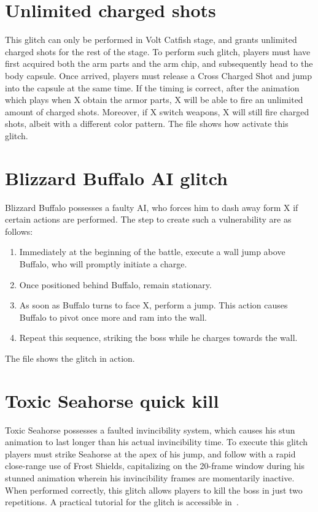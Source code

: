 \section{Unlimited charged shots}
This glitch can only be performed in Volt Catfish stage, and grants unlimited charged shots for the rest of the stage. To perform such glitch, players must have first acquired both the arm parts and the arm chip, and subsequently head to the body capsule. Once arrived, players must release a Cross Charged Shot and jump into the capsule at the same time. If the timing is correct, after the animation which plays when X obtain the armor parts, X will be able to fire an unlimited amount of charged shots. Moreover, if X switch weapons, X will still fire charged shots, albeit with a different color pattern. The file  shows how activate this glitch.

\section{Blizzard Buffalo AI glitch}\label{glitch:Buffalo_AI}
Blizzard Buffalo possesses a faulty AI, who forces him to dash away form X if certain actions are performed. The step to create such a vulnerability are as follows:
\begin{enumerate}
	\item Immediately at the beginning of the battle, execute a wall jump above Buffalo, who will promptly initiate a charge.
	\item Once positioned behind Buffalo, remain stationary.
	\item As soon as Buffalo turns to face X, perform a jump. This action causes Buffalo to pivot once more and ram into the wall.
	\item Repeat this sequence, striking the boss while he charges towards the wall.
\end{enumerate}

The file  shows the glitch in action.

\section{Toxic Seahorse quick kill}\label{glitch:Sehorse}
Toxic Seahorse possesses a faulted invincibility system, which causes his stun animation to last longer than his actual invincibility time. To execute this glitch players must strike Seahorse at the apex of his jump, and follow with a rapid close-range use of Frost Shields, capitalizing on the 20-frame window during his stunned animation wherein his invincibility frames are momentarily inactive. When performed correctly, this glitch allows players to kill the boss in just two repetitions. A practical tutorial for the glitch is accessible in~\cite{video:seahorse_two_cicle}. 
 
